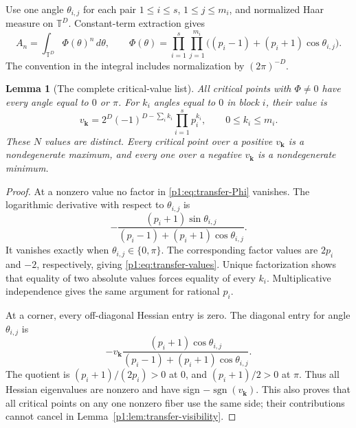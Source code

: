 \documentclass[11pt,a4paper]{article}
\newtheorem{lemma}[theorem]{Lemma}
\theoremstyle{definition}
\theoremstyle{remark}
\numberwithin{equation}{section}
\begin{document}
Use one angle $\theta_{i,j}$ for each pair $1\leq i\leq s$,
$1\leq j\leq m_i$, and normalized Haar measure on $\mathbb T^D$.
Constant-term extraction gives
\begin{equation}\label{p1:eq:transfer-Phi}
 A_n=\int_{\mathbb T^D}\Phi(\theta)^n\,d\theta,\qquad
 \Phi(\theta)=\prod_{i=1}^s\prod_{j=1}^{m_i}
 \bigl((p_i-1)+(p_i+1)\cos\theta_{i,j}\bigr).
\end{equation}
The convention in the integral includes normalization by $(2\pi)^{-D}$.

\begin{lemma}[The complete critical-value list]
\label{p1:lem:transfer-corners}
All critical points with $\Phi\ne0$ have every angle equal to $0$ or $\pi$.
For $k_i$ angles equal to $0$ in block $i$, their value is
\begin{equation}\label{p1:eq:transfer-values}
 v_{\boldsymbol k}=2^D(-1)^{D-\sum_i k_i}
                    \prod_{i=1}^s p_i^{k_i},
 \qquad 0\leq k_i\leq m_i.
\end{equation}
These $N$ values are distinct.  Every critical point over a positive
$v_{\boldsymbol k}$ is a nondegenerate maximum, and every one over a
negative $v_{\boldsymbol k}$ is a nondegenerate minimum.
\end{lemma}

\begin{proof}
At a nonzero value no factor in \eqref{p1:eq:transfer-Phi} vanishes.
The logarithmic derivative with respect to $\theta_{i,j}$ is
\[
 -\frac{(p_i+1)\sin\theta_{i,j}}
 {(p_i-1)+(p_i+1)\cos\theta_{i,j}}.
\]
It vanishes exactly when $\theta_{i,j}\in\{0,\pi\}$.
The corresponding factor values are $2p_i$ and $-2$, respectively,
giving \eqref{p1:eq:transfer-values}.  Unique factorization shows that
equality of two absolute values forces equality of every $k_i$.
Multiplicative independence gives the same argument for rational $p_i$.

At a corner, every off-diagonal Hessian entry is zero.  The diagonal entry
for angle $\theta_{i,j}$ is
\[
 -v_{\boldsymbol k}
 \frac{(p_i+1)\cos\theta_{i,j}}
 {(p_i-1)+(p_i+1)\cos\theta_{i,j}}.
\]
The quotient is $(p_i+1)/(2p_i)>0$ at $0$, and $(p_i+1)/2>0$
at $\pi$.  Thus all Hessian eigenvalues are nonzero and have sign
$-\operatorname{sgn}(v_{\boldsymbol k})$.  This also proves that all
critical points on any one nonzero fiber use the same side; their
contributions cannot cancel in Lemma~\ref{p1:lem:transfer-visibility}.
\end{proof}
\end{document}
